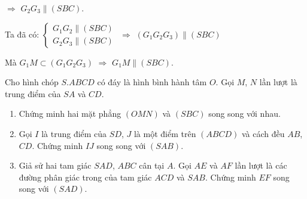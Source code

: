 \begin{bt}
{		$\Rightarrow$ $G_2G_3 \parallel (SBC)$.
		
		Ta đã có: $\begin{cases} G_1G_2 \parallel (SBC) \\ G_2G_3 \parallel (SBC) \end{cases}$ $\Rightarrow$ $(G_1G_2G_3) \parallel (SBC)$ 
		
		Mà $G_1M \subset (G_1G_2G_3)$ $\Rightarrow$ $G_1M \parallel (SBC)$.
	}
\end{bt}

\begin{bt}%
	Cho hình chóp $S.ABCD$ có đáy là hình bình hành tâm $O$. Gọi $M$, $N$ lần lượt là trung điểm của $SA$ và $CD$.
	\begin{enumerate}
		\item Chứng minh hai mặt phẳng $(OMN)$ và $(SBC)$ song song với nhau.
		\item Gọi $I$ là trung điểm của $SD$, $J$ là một điểm trên $(ABCD)$ và cách đều $AB$, $CD$. Chứng minh $IJ$ song song với $(SAB)$.
		\item Giả sử hai tam giác $SAD$, $ABC$ cân tại $A$. Gọi $AE$ và $AF$ lần lượt là các đường phân giác trong của tam giác $ACD$ và $SAB$. Chứng minh $EF$ song song với $(SAD)$.
	\end{enumerate}
\end{bt}
